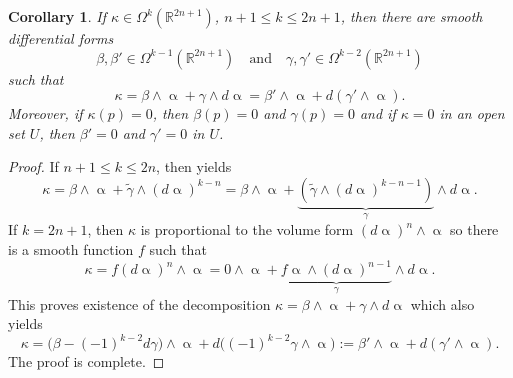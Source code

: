 \documentclass[intlimits,12pt,reqno]{amsart}
\newcommand{\R}{\mathbb R}
\numberwithin{equation}{section}
\newtheorem{corollary}[theorem]{Corollary}
\theoremstyle{definition}
\begin{document}
\begin{corollary}
\label{T49}
If $\kappa\in \Omega^k(\R^{2n+1})$, $n+1\leq k\leq 2n+1$, then there are smooth differential forms
$$
\beta,\beta'\in \Omega^{k-1}(\R^{2n+1})
\quad
\text{and}
\quad
\gamma,\gamma'\in \Omega^{k-2}(\R^{2n+1}) 
$$
such that
$$
\kappa=\beta\wedge\upalpha+\gamma\wedge d\upalpha=
\beta'\wedge\upalpha+d(\gamma'\wedge\upalpha).
$$
Moreover, if $\kappa(p)=0$, then $\beta(p)=0$ and $\gamma(p)=0$ and if $\kappa=0$ in an open set $U$, then $\beta'=0$ and $\gamma'=0$ in $U$.
\end{corollary}
\begin{proof}
If $n+1\leq k\leq 2n$, then  yields
$$
\kappa=\beta\wedge\upalpha +\tilde{\gamma}\wedge (d\upalpha)^{k-n} =
\beta\wedge\upalpha + \underbrace{(\tilde{\gamma}\wedge (d\upalpha)^{k-n-1})}_{\gamma}\wedge d\upalpha.
$$
If $k=2n+1$, then $\kappa$ is proportional to the volume form $(d\upalpha)^n\wedge \upalpha$ so there is a smooth function $f$ such that
$$
\kappa=f(d\upalpha)^n\wedge\upalpha=
0\wedge\upalpha +\underbrace{f\upalpha\wedge(d\upalpha)^{n-1}}_{\gamma}\wedge d\upalpha.
$$
This proves existence of the decomposition
$\kappa=\beta\wedge\upalpha+\gamma\wedge d\upalpha$ which also yields
$$
\kappa=\big(\beta-(-1)^{k-2}d\gamma\big)\wedge\upalpha+d\big((-1)^{k-2}\gamma\wedge\upalpha\big):=
\beta'\wedge\upalpha+d(\gamma'\wedge\upalpha).
$$
The proof is complete.
\end{proof}
\end{document}
